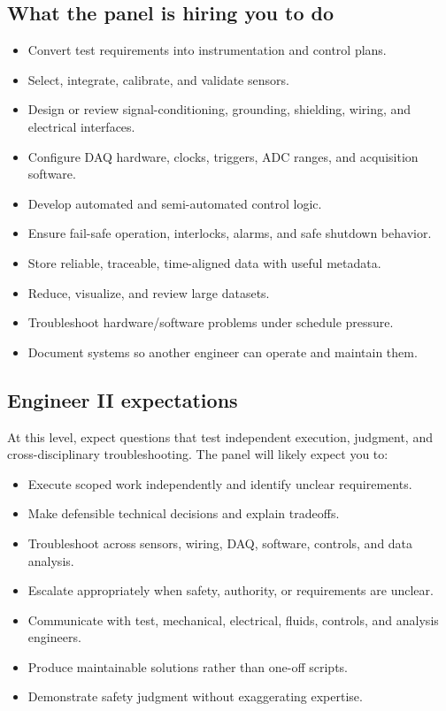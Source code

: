 \documentclass[11pt]{article}
\begin{document}
\subsection{What the panel is hiring you to do}
\begin{itemize}
  \item Convert test requirements into instrumentation and control plans.
  \item Select, integrate, calibrate, and validate sensors.
  \item Design or review signal-conditioning, grounding, shielding, wiring, and electrical interfaces.
  \item Configure DAQ hardware, clocks, triggers, ADC ranges, and acquisition software.
  \item Develop automated and semi-automated control logic.
  \item Ensure fail-safe operation, interlocks, alarms, and safe shutdown behavior.
  \item Store reliable, traceable, time-aligned data with useful metadata.
  \item Reduce, visualize, and review large datasets.
  \item Troubleshoot hardware/software problems under schedule pressure.
  \item Document systems so another engineer can operate and maintain them.
\end{itemize}

\subsection{Engineer II expectations}
At this level, expect questions that test independent execution, judgment, and
cross-disciplinary troubleshooting. The panel will likely expect you to:
\begin{itemize}
  \item Execute scoped work independently and identify unclear requirements.
  \item Make defensible technical decisions and explain tradeoffs.
  \item Troubleshoot across sensors, wiring, DAQ, software, controls, and data analysis.
  \item Escalate appropriately when safety, authority, or requirements are unclear.
  \item Communicate with test, mechanical, electrical, fluids, controls, and analysis engineers.
  \item Produce maintainable solutions rather than one-off scripts.
  \item Demonstrate safety judgment without exaggerating expertise.
\end{itemize}
\end{document}
